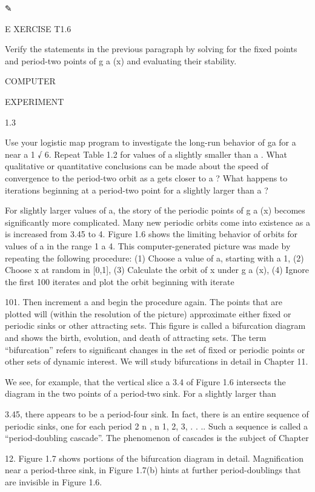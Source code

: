 ✎

E XERCISE T1.6

Verify the statements in the previous paragraph by solving for the ﬁxed points and period-two points of g 
a (x) and evaluating their stability.


COMPUTER

EXPERIMENT

1.3

Use your logistic map program to investigate the long-run behavior of ga  for a near a   1 √ 6. Repeat 
Table 1.2 for values of a slightly smaller than a  . What qualitative or quantitative conclusions can be 
made about the speed of convergence to the period-two orbit as a gets closer to a  ? What happens to 
iterations beginning at a period-two point for a slightly larger than a  ?

For slightly larger values of a, the story of the periodic points of g a (x) becomes signiﬁcantly more 
complicated. Many new periodic orbits come into existence as a is increased from 3.45 to 4. Figure 1.6 
shows the limiting behavior of orbits for values of a in the range 1   a  4. This computer-generated 
picture was made by repeating the following procedure: (1) Choose a value of a, starting with a  1, (2) 
Choose x at random in [0,1], (3) Calculate the orbit of x under g a (x), (4) Ignore the ﬁrst 100 iterates 
and plot the orbit beginning with iterate

101. Then increment a and begin the procedure again. The points that are plotted will (within the 
resolution of the picture) approximate either ﬁxed or periodic sinks or other attracting sets. This ﬁgure 
is called a bifurcation diagram and shows the birth, evolution, and death of attracting sets. The term 
“bifurcation” refers to signiﬁcant changes in the set of ﬁxed or periodic points or other sets of dynamic 
interest. We will study bifurcations in detail in Chapter 11.

We see, for example, that the vertical slice a  3.4 of Figure 1.6 intersects the diagram in the two points 
of a period-two sink. For a slightly larger than

3.45, there appears to be a period-four sink. In fact, there is an entire sequence of periodic sinks, one 
for each period 2 n , n  1, 2, 3, . . .. Such a sequence is called a “period-doubling cascade”. The 
phenomenon of cascades is the subject of Chapter

12. Figure 1.7 shows portions of the bifurcation diagram in detail. Magniﬁcation near a period-three sink, 
in Figure 1.7(b) hints at further period-doublings that are invisible in Figure 1.6.

